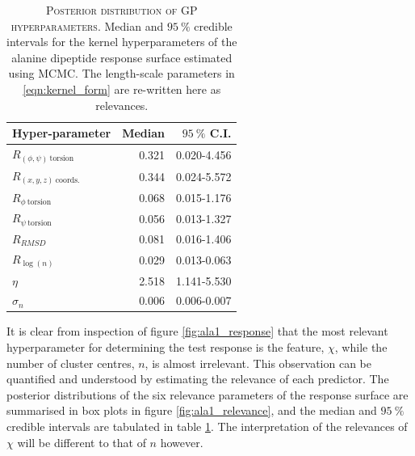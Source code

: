 \begin{table}
    \centering
    \caption[Posterior distribution of GP hyperparameters]{\textsc{Posterior distribution of GP hyperparameters}. Median and $\SI{95}{\percent}$ credible intervals for the kernel hyperparameters of the alanine dipeptide response surface estimated using MCMC. The length-scale parameters in \ref{eqn:kernel_form} are re-written here as relevances.}
    \begin{tabular}{lrr}
    \toprule
                          Hyper-parameter &    Median & $\SI{95}{\percent}$ C.I. \\
    \midrule
     $R_{(\phi, \psi)\ \mathrm{torsion}}$ &  0.321 & 0.020-4.456 \\
        $R_{(x, y, z)\ \mathrm{coords.}}$ &  0.344 & 0.024-5.572 \\
             $R_{\phi\ \mathrm{torsion}}$ &  0.068 & 0.015-1.176 \\
             $R_{\psi\ \mathrm{torsion}}$ &  0.056 & 0.013-1.327 \\
                               $R_{RMSD}$ &  0.081 & 0.016-1.406 \\
                          $R_{\log{(n)}}$ &  0.029 & 0.013-0.063 \\
                                   $\eta$ &  2.518 & 1.141-5.530 \\
                               $\sigma_n$ &  0.006 & 0.006-0.007 \\
    \bottomrule
    \end{tabular}
    \label{tab:ala1_rel_post}
\end{table}

It is clear from inspection of figure \ref{fig:ala1_response} that the most relevant hyperparameter for determining the test response is the feature, $\chi$, while the number of cluster centres,  $n$, is almost irrelevant. This observation can be quantified and understood by estimating the relevance of each predictor. The posterior distributions of the six relevance parameters of the response surface are summarised in box plots in figure \ref{fig:ala1_relevance}, and  the median and $\SI{95}{\percent}$ credible intervals  are tabulated in table \ref{tab:ala1_rel_post}. The interpretation of the relevances of $\chi$ will be different to that of $n$ however. 

